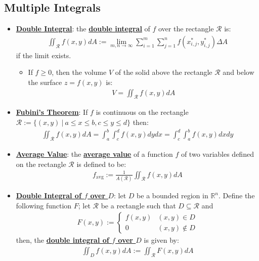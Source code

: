\documentclass[11pt]{article}
\newcommand{\dfn}[1]{\underline{\textbf{#1}}}
\newcommand{\R}[0]{\mathbb{R}}
\begin{document}
\subsection{Multiple Integrals}
\begin{itemize}
	\item \dfn{Double Integral}: the \dfn{double integral} of $f$ over the rectangle $\mathcal{R}$ is: 
	\begin{align}
		\iint_{\mathcal{R}} f(x,y) dA := \lim_{m,n \rightarrow \infty} \sum_{i=1}^m \sum_{j=1}^n f(x_{i,j}^*, y_{i,j}^*) \Delta A 	
	\end{align}
	if the limit exists.
	\begin{itemize}
		\item If $f \geq 0$, then the volume $V$ of the solid above the rectangle $\mathcal{R}$ and below the surface $z=f(x,y)$ is:
		\begin{align}
			V = \iint_{\mathcal{R}} f(x,y) dA	
		\end{align}
	\end{itemize}
	\item \dfn{Fubini's Theorem}: If $f$ is continuous on the rectangle $\mathcal{R} := \{ (x,y)\ |\ a \leq x \leq b, c \leq y \leq d \}$ then: 
	\begin{align}
		\iint_{\mathcal{R}} f(x,y) dA = \int_a^b \int_c^d f(x,y) dy dx = \int_c^d \int_a^b f(x,y) dx dy 	
	\end{align}
	\item \dfn{Average Value}: the \dfn{average value} of a function $f$ of two variables defined on the rectangle $\mathcal{R}$ is defined to be: 
	\begin{align}
		f_{\text{avg}} := \frac{1}{A(\mathcal{R})} \iint_{\mathcal{R}} f(x,y) dA 	
	\end{align}
	\item \dfn{Double Integral of $f$ over $D$}: let $D$ be a bounded region in $\R^n$. Define the following function $F$; let $\mathcal{R}$ be a rectangle such that $D \subseteq \mathcal{R}$ and 
	\begin{align}
		F(x,y) := \begin{cases}
			f(x,y) & (x,y) \in D \\
			0 	   & (x,y) \notin D 
		\end{cases}	
	\end{align}
		then, the \dfn{double integral of $f$ over $D$} is given by:
		\begin{align}
			\iint_{D} f(x,y) dA := \iint_{\mathcal{R}} F(x,y) dA 
	    \end{align}

\end{itemize}
\end{document}
